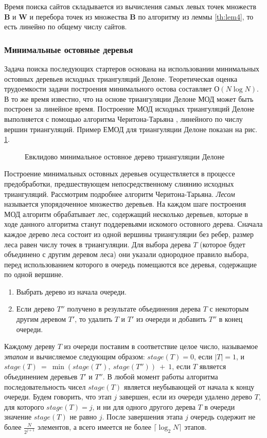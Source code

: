 \documentclass[12pt]{article}
\begin{document}
Время поиска сайтов складывается из вычисления самых левых точек множеств $\textbf{B}$ и $\textbf{W}$ и
перебора точек из множества $\textbf{B}$ по алгоритму из леммы \ref{th:lem4},
то есть линейно по общему числу сайтов.

\subsubsection{Минимальные остовные деревья}
Задача поиска последующих стартеров основана на использовании минимальных остовных деревьев исходных триангуляций Делоне.
Теоретическая оценка трудоемкости задачи построения минимального остова составляет $О(N\log N)$.
В то же время известно, что на основе триангуляции Делоне МОД может быть построен за линейное время.
Построение МОД исходных триангуляций Делоне выполняется с помощью алгоритма Черитона-Тарьяна \cite[стр. 278-280]{Preparata},
линейного по числу вершин триангуляций.
Пример ЕМОД для триангуляции Делоне показан на рис. \ref{pic:mst}.

\begin{figure}[htb!]
	\caption{Евклидово минимальное остовное дерево триангуляции Делоне}
	\label{pic:mst}
\end{figure}

Построение минимальных остовных деревьев осуществляется в процессе предобработки,
предшествующем непосредственному слиянию исходных триангуляций.
Рассмотрим подробнее алгоритм Черитона-Тарьяна.
{\itshape Лесом} называется упорядоченное множество деревьев.
На каждом шаге построения МОД алгоритм обрабатывает лес, содержащий несколько деревьев,
которые в ходе данного алгоритма станут поддеревьями искомого остовного дерева.
Сначала каждое дерево леса состоит из одной вершины триангуляции без ребер,
размер леса равен числу точек в триангуляции.
Для выбора дерева $T$ (которое будет объединено с другим деревом леса) они указали однородное правило выбора, перед использованием которого в очередь помещаются все деревья, содержащие по одной вершине.
\begin{enumerate}
	\item Выбрать дерево из начала очереди.
	\item Если дерево $T''$ получено в результате объединения дерева $T$ с некоторым другим деревом $T'$,
		то удалить $T$ и $T'$ из очереди и добавить $T''$ в конец очереди.
\end{enumerate}

Каждому дереву $T$ из очереди поставим в соответствие целое число, называемое {\itshape этапом} и вычисляемое следующим образом:
$stage(T) = 0$, если $|T| = 1$, и $stage(T)~=~\min(stage(T'),~stage(T''))~+~1$,
если $T$ является объединением деревьев $T'$ и $T''$.
В любой момент работы алгоритма последовательность чисел $stage(T)$ является неубывающей от начала к концу очереди.
Будем говорить, что этап $j$ завершен, если из очереди удалено дерево $T$,
для которого $stage(T) = j$, и ни для одного другого дерева $T$ в очереди значение $stage(T)$ не равно $j$.
После завершения этапа $j$ очередь содержит не более $\frac{N}{2^{j + 1}}$ элементов,
а всего имеется не более $\lceil\log_2N\rceil$ этапов.
\end{document}
